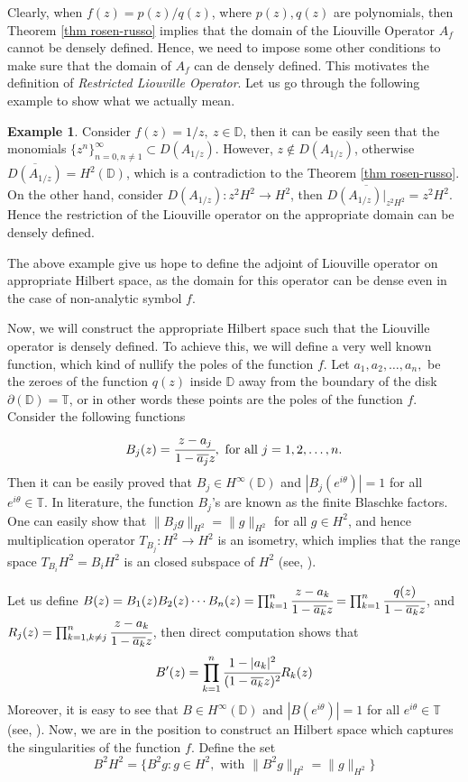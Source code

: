 \documentclass[preprint,12pt]{elsarticle} %
\theoremstyle{plain}
\theoremstyle{definition}
\newtheorem{example}[theorem]{Example}
\theoremstyle{remark}
\begin{document}
Clearly, when $f(z)=p(z)/q(z)$, where $p(z), q(z)$ are polynomials, then Theorem \ref{thm rosen-russo} implies that the domain of the Liouville Operator $A_f$ cannot be densely defined. Hence, we need to impose some other conditions to make sure that the domain of $A_f$ can de densely defined. This motivates the definition of \textit{Restricted Liouville Operator}. Let us go through the following example to show what we actually mean.
\begin{example}
    Consider $f(z)=1/z, ~z\in \mathbb{D}$, then it can be easily seen that the monomials $\{z^n\}_{n=0,n\neq 1}^{\infty} \subset D(A_{1/z})$. However, $z\notin D(A_{1/z})$, otherwise $\overline{D(A_{1/z})}=H^2(\mathbb{D})$, which is a contradiction to the Theorem \ref{thm rosen-russo}. On the other hand, consider $D(A_{1/z}):z^2H^2\rightarrow H^2$, then $\overline{D(A_{1/z})|_{z^2H^2}}=z^2H^2$. Hence the restriction of the Liouville operator on the appropriate domain can be densely defined.
\end{example}
The above example give us hope to define the adjoint of Liouville operator on appropriate Hilbert space, as the domain for this operator can be dense even in the case of non-analytic symbol $f$. 

Now, we will construct the appropriate Hilbert space such that the Liouville operator is densely defined. To achieve this, we will define a very well known function, which kind of nullify the poles of the function $f$. Let $a_1,a_2,\ldots,a_n,$ be the zeroes of the function $q(z)$ inside $\mathbb{D}$ away from the boundary of the disk $\partial(\mathbb{D})=\mathbb{T}$, or in other words these points are the poles of the function $f$. Consider the following functions
$$
B_j(z)= \cfrac{z-a_j}{1-\overline{a_j} z}, \text{~for all~} j=1,2,\ldots,n.
$$
Then it can be easily proved that $B_j\in H^{\infty}(\mathbb{D})$ and $|B_j(e^{i\theta})|=1$ for all $e^{i\theta}\in \mathbb{T}$. In literature, the function $B_j$'s are known as the finite Blaschke factors. One can easily show that $\|B_j g\|_{H^2}=\|g\|_{H^2}$ for all $g\in H^2$, and hence multiplication operator $T_{B_{j}}:H^2\rightarrow H^2$ is an isometry, which implies that the range space $T_{B_{i}}H^2=B_i H^2$ is an closed subspace of $H^2$ (see, \cite{lata2022multivariable}). 

Let us define $B(z)=B_1(z)B_2(z)\cdots B_n(z)=\prod_{k=1}^{n}\cfrac{z-a_k}{1-\overline{a_k}z}=\prod_{k=1}^{n}\cfrac{q(z)}{1-\overline{a_k}z}$, and $R_j (z)=\prod_{k=1, k\neq j}^{n}\cfrac{z-a_k}{1-\overline{a_k}z}$, then direct computation shows that
$$
B'(z)=\prod_{k=1}^{n}\cfrac{1-|a_k|^2}{(1-\overline{a_k}z)^2}R_k(z)
$$ 
Moreover, it is easy to see that $B\in H^{\infty}(\mathbb{D})$ and $|B(e^{i\theta})|=1$ for all $e^{i\theta}\in \mathbb{T}$ (see, \cite{fricain2016theory}). Now, we are in the position to construct an Hilbert space which captures the singularities of the function $f$. Define the set 
$$B^2H^2=\{B^2g:g\in H^2,\text{~with~} \|B^2 g\|_{H^2}=\|g\|_{H^2}\}$$
\end{document}
